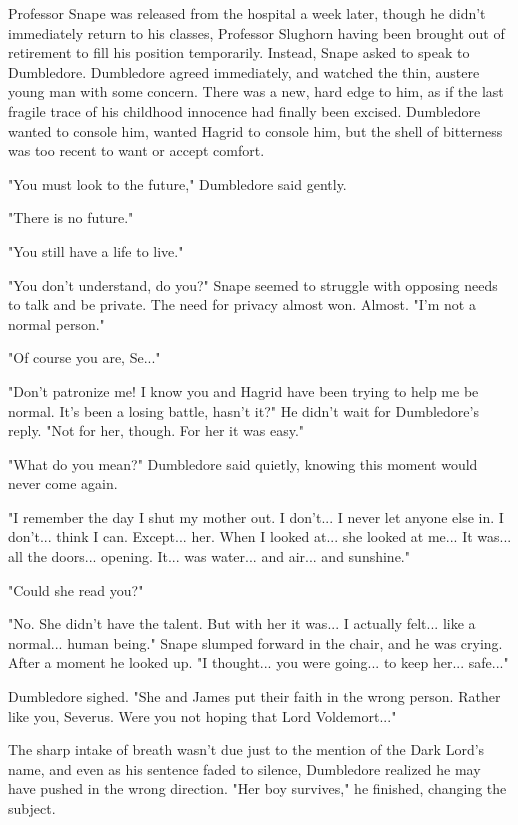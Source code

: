 Professor Snape was released from the hospital a week later, though he didn't immediately return to his classes, Professor Slughorn having been brought out of retirement to fill his position temporarily. Instead, Snape asked to speak to Dumbledore. Dumbledore agreed immediately, and watched the thin, austere young man with some concern. There was a new, hard edge to him, as if the last fragile trace of his childhood innocence had finally been excised. Dumbledore wanted to console him, wanted Hagrid to console him, but the shell of bitterness was too recent to want or accept comfort.

"You must look to the future," Dumbledore said gently.

"There is no future."

"You still have a life to live."

"You don't understand, do you?" Snape seemed to struggle with opposing needs to talk and be private. The need for privacy almost won. Almost. "I'm not a normal person."

"Of course you are, Se..."

"Don't patronize me! I know you and Hagrid have been trying to help me be normal. It's been a losing battle, hasn't it?" He didn't wait for Dumbledore's reply. "Not for her, though. For her it was easy."

"What do you mean?" Dumbledore said quietly, knowing this moment would never come again.

"I remember the day I shut my mother out. I don't... I never let anyone else in. I don't... think I can. Except... her. When I looked at... she looked at me... It was... all the doors... opening. It... was water... and air... and sunshine."

"Could she read you?"

"No. She didn't have the talent. But with her it was... I actually felt... like a normal... human being." Snape slumped forward in the chair, and he was crying. After a moment he looked up. "I thought... you were going... to keep her... safe..."

Dumbledore sighed. "She and James put their faith in the wrong person. Rather like you, Severus. Were you not hoping that Lord Voldemort..."

The sharp intake of breath wasn't due just to the mention of the Dark Lord's name, and even as his sentence faded to silence, Dumbledore realized he may have pushed in the wrong direction. "Her boy survives," he finished, changing the subject.

